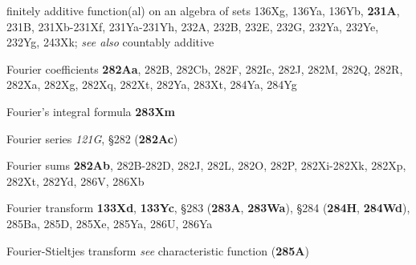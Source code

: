 finitely additive function(al) on an algebra of sets 136Xg, 136Ya,
136Yb,
  {\bf 231A}, 231B, 231Xb-231Xf, 
231Ya-231Yh, 
232A, 232B, 232E, 232G, 232Ya, 232Ye, 232Yg, 243Xk; 
  {\it see also} countably additive
  




























































Fourier coefficients {\bf 282Aa}, 282B, 282Cb, 282F, 282Ic, 282J,
282M, 282Q, 282R, 282Xa, 282Xg, 282Xq, 282Xt, 282Ya, 283Xt, 284Ya, 284Yg


Fourier's integral formula {\bf 283Xm}


Fourier series {\it 121G}, \S282 ({\bf 282Ac})

Fourier sums {\bf 282Ab}, 282B-282D, 
282J, 282L, 282O, 282P, 282Xi-282Xk, 
282Xp, 282Xt, 282Yd, 286V, 286Xb


Fourier transform {\bf 133Xd}, {\bf 133Yc},
  \S283 ({\bf 283A}, {\bf 283Wa}), \S284 ({\bf 284H}, {\bf 284Wd}),
285Ba, 285D, 285Xe, 285Ya, 286U, 286Ya


Fourier-Stieltjes transform 
  {\it see} characteristic function ({\bf 285A})












